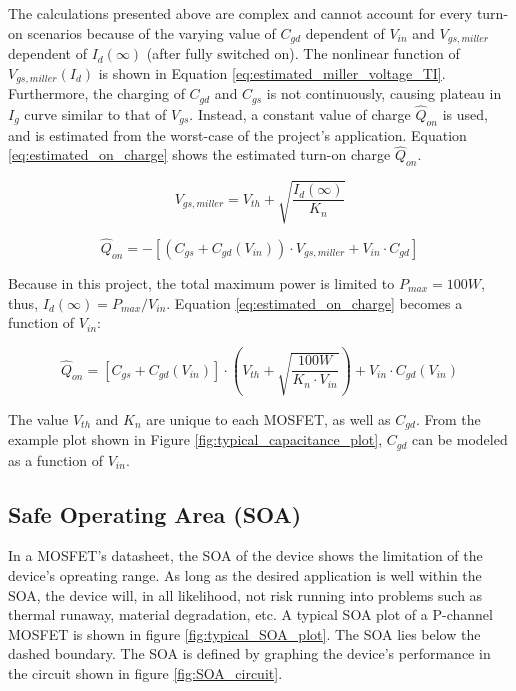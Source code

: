 \documentclass[main.tex]{subfiles}
\begin{document}
    \justify
    The calculations presented above are complex and cannot account for every turn-on scenarios because of the varying value of $C_{gd}$ dependent of $V_{in}$ and $V_{gs,miller}$ dependent of $I_{d}(\infty)$ (after fully switched on). The nonlinear function of $V_{gs,miller}(I_d)$ is shown in Equation \eqref{eq:estimated_miller_voltage_TI}. Furthermore, the charging of $C_{gd}$ and $C_{gs}$ is not continuously, causing plateau in $I_{g}$ curve similar to that of $V_{gs}$. Instead, a constant value of charge $\hat{Q}_{on}$ is used, and is estimated from the worst-case of the project's application. Equation \eqref{eq:estimated_on_charge} shows the estimated turn-on charge $\hat{Q}_{on}$.

    \begin{equation} \label{eq:estimated_miller_voltage_TI}
        V_{gs, miller} = V_{th} + \sqrt{\frac{I_{d}(\infty)}{K_n}}
    \end{equation}

    \begin{equation} \label{eq:estimated_on_charge}
        \hat{Q}_{on} = -[(C_{gs} +C_{gd}(V_{in}))\cdot V_{gs, miller} + V_{in}\cdot C_{gd}]
    \end{equation}

    \justify 
    Because in this project, the total maximum power is limited to $P_{max}=100W$, thus, $I_d(\infty) = P_{max}/V_{in}$. Equation \eqref{eq:estimated_on_charge} becomes a function of $V_{in}$:

    \begin{equation} \label{eq:estimated_on_charge_2}
        \hat{Q}_{on} = [C_{gs} +C_{gd}(V_{in})]\cdot \left(V_{th} + \sqrt{\dfrac{100W}{K_n\cdot V_{in}}} \right) + V_{in}\cdot C_{gd}(V_{in})
    \end{equation}

    \justify
    The value $V_{th}$ and $K_n$ are unique to each MOSFET, as well as $C_{gd}$. From the example plot shown in Figure \ref{fig:typical_capacitance_plot}, $C_{gd}$ can be modeled as a function of $V_{in}$.

    \pagebreak
    \subsection{Safe Operating Area (SOA)}
    In a MOSFET's datasheet, the SOA of the device shows the limitation of the device's opreating range. As long as the desired application is well within the SOA, the device will, in all likelihood, not risk running into problems such as thermal runaway, material degradation, etc. A typical SOA plot of a P-channel MOSFET is shown in figure \ref{fig:typical_SOA_plot}. The SOA lies below the dashed boundary. The SOA is defined by graphing the device's performance in the circuit shown in figure \ref{fig:SOA_circuit}.
\end{document}
